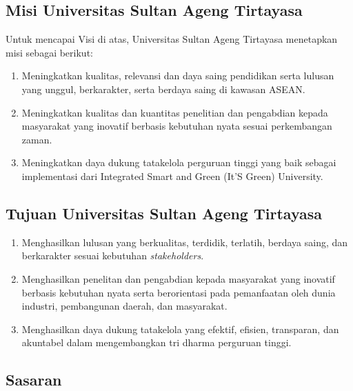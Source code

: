 \documentclass[
]{book}
\providecommand{\tightlist}{%
  \setlength{\itemsep}{0pt}\setlength{\parskip}{0pt}}
\begin{document}
\hypertarget{misi-universitas-sultan-ageng-tirtayasa}{%
\subsection{Misi Universitas Sultan Ageng Tirtayasa}\label{misi-universitas-sultan-ageng-tirtayasa}}

Untuk mencapai Visi di atas, Universitas Sultan Ageng Tirtayasa menetapkan misi sebagai berikut:

\begin{enumerate}
\def\labelenumi{\arabic{enumi}.}
\tightlist
\item
  Meningkatkan kualitas, relevansi dan daya saing pendidikan serta lulusan yang unggul, berkarakter, serta berdaya saing di kawasan ASEAN.
\item
  Meningkatkan kualitas dan kuantitas penelitian dan pengabdian kepada masyarakat yang inovatif berbasis kebutuhan nyata sesuai perkembangan zaman.
\item
  Meningkatkan daya dukung tatakelola perguruan tinggi yang baik sebagai implementasi dari Integrated Smart and Green (It'S Green) University.
\end{enumerate}

\hypertarget{tujuan-universitas-sultan-ageng-tirtayasa}{%
\subsection{Tujuan Universitas Sultan Ageng Tirtayasa}\label{tujuan-universitas-sultan-ageng-tirtayasa}}

\begin{enumerate}
\def\labelenumi{\arabic{enumi}.}
\tightlist
\item
  Menghasilkan lulusan yang berkualitas, terdidik, terlatih, berdaya saing, dan berkarakter sesuai kebutuhan \emph{stakeholders}.
\item
  Menghasilkan penelitan dan pengabdian kepada masyarakat yang inovatif berbasis kebutuhan nyata serta berorientasi pada pemanfaatan oleh dunia industri, pembangunan daerah, dan masyarakat.
\item
  Menghasilkan daya dukung tatakelola yang efektif, efisien, transparan, dan akuntabel dalam mengembangkan tri dharma perguruan tinggi.
\end{enumerate}

\hypertarget{sasaran}{%
\subsection{Sasaran}\label{sasaran}}
\end{document}
